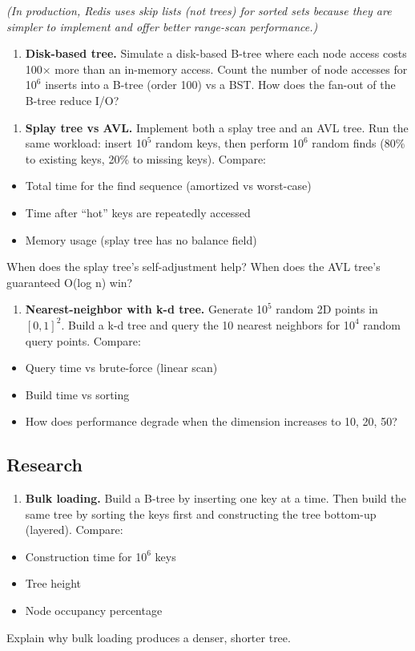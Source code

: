    \textit{(In production, Redis uses skip lists (not trees) for sorted sets because they are simpler to implement and offer better range-scan performance.)}

\begin{enumerate}
\item \textbf{Disk-based tree.} Simulate a disk-based B-tree where each node access costs 100$\times $ more than an in-memory access. Count the number of node accesses for 1$0^{6}$ inserts into a B-tree (order 100) vs a BST. How does the fan-out of the B-tree reduce I/O?
\end{enumerate}

\begin{enumerate}
\item \textbf{Splay tree vs AVL.} Implement both a splay tree and an AVL tree. Run the same workload: insert 1$0^{5}$ random keys, then perform 1$0^{6}$ random finds (80\% to existing keys, 20\% to missing keys). Compare:
\end{enumerate}
\begin{itemize}
\item Total time for the find sequence (amortized vs worst-case)
\item Time after ``hot'' keys are repeatedly accessed
\item Memory usage (splay tree has no balance field)
\end{itemize}
   When does the splay tree's self-adjustment help? When does the AVL tree's guaranteed O(log n) win?

\begin{enumerate}
\item \textbf{Nearest-neighbor with k-d tree.} Generate 1$0^{5}$ random 2D points in $[0, 1]^2$. Build a k-d tree and query the 10 nearest neighbors for 1$0^{4}$ random query points. Compare:
\end{enumerate}
\begin{itemize}
\item Query time vs brute-force (linear scan)
\item Build time vs sorting
\item How does performance degrade when the dimension increases to 10, 20, 50?
\end{itemize}

\subsection{Research}

\begin{enumerate}
\item \textbf{Bulk loading.} Build a B-tree by inserting one key at a time. Then build the same tree by sorting the keys first and constructing the tree bottom-up (layered). Compare:
\end{enumerate}
\begin{itemize}
\item Construction time for 1$0^{6}$ keys
\item Tree height
\item Node occupancy percentage
\end{itemize}
    Explain why bulk loading produces a denser, shorter tree.

